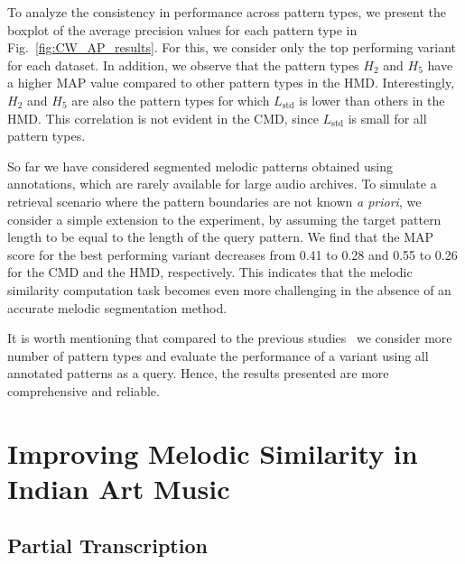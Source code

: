 To analyze the consistency in performance across pattern types, we present the boxplot of the average precision values for each pattern type in Fig.~\ref{fig:CW_AP_results}. For this, we consider only the top performing variant for each dataset.   In addition, we observe that the pattern types $H_2$ and $H_5$ have a higher MAP value compared to other pattern types in the HMD. Interestingly, $H_2$ and $H_5$ are also the pattern types for which $L_{\mathrm{std}}$ is lower than others in the HMD. This correlation is not evident in the CMD, since $L_{\mathrm{std}}$ is small for all pattern types. 

So far we have considered segmented melodic patterns obtained using annotations, which are rarely available for large audio archives. To simulate a retrieval scenario where the pattern boundaries are not known \textit{a priori}, we consider a simple extension to the experiment, by assuming the target pattern length to be equal to the length of the query pattern. We find that the MAP score for the best performing variant decreases from 0.41 to 0.28 and 0.55 to 0.26 for the CMD and the HMD, respectively. This indicates that the melodic similarity computation task becomes even more challenging in the absence of an accurate melodic segmentation method.



It is worth mentioning that compared to the previous studies~\cite{Ishwar2013, Ross2012b} we consider more number of pattern types and evaluate the performance of a variant using all annotated patterns as a query. Hence, the results presented are more comprehensive and reliable.





\section{Improving Melodic Similarity in Indian Art Music}
\label{sec:patterns_improving_melodic_similarity}

\subsection{Partial Transcription}
\label{partial_transcription}

